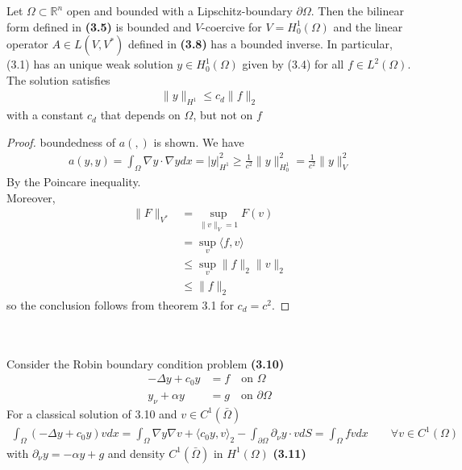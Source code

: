 \begin{theorem}
	Let $\Omega \subset \mathbb{R}^n$ open and bounded with a Lipschitz-boundary $\partial \Omega$. Then the bilinear form defined in \textbf{(3.5)} is bounded and $V$-coercive for $V = H_0^1(\Omega)$ and the linear operator $A \in L(V, V^*)$ defined in \textbf{(3.8)} has a bounded inverse. In particular, (3.1) has an unique weak solution $y \in H_0^1(\Omega)$ given by (3.4) for all $f \in L^2(\Omega)$. The solution satisfies
	\begin{align*}
		\|y\|_{H^1} \le c_d \|f\|_2
	\end{align*}
	with a constant $c_d$ that depends on $\Omega$, but not on $f$
\end{theorem}
\begin{proof}
	boundedness of $a(,)$ is shown. We have
	\begin{align*}
		a(y, y) = \int_\Omega \nabla y \cdot \nabla y dx = |y|^2_{H^1} 
		\geq \frac{1}{c^2} \|y\|_{H_0^1}^2 = \frac{1}{c^2}\|y\|^2_V
	\end{align*}
	By the Poincare inequality. \\
	Moreover, 
	\begin{align*}
		\|F\|_{V^*} &= \sup_{\|v\|_V = 1} F(v) \\
		&= \sup_v \langle f, v \rangle \\
		&\le \sup_v \|f\|_2 \|v\|_2 \\
		&\le \|f\|_2
	\end{align*}
	so the conclusion follows from theorem 3.1 for $c_d = c^2$. 
\end{proof}
\quad\\
\quad\\
Consider the Robin boundary condition problem \textbf{(3.10)}
\begin{align*}
	-\Delta y + c_0 y &= f \quad \text{on } \Omega \\
	y_\nu + \alpha y &= g \quad \text{on } \partial \Omega
\end{align*}
For a classical solution of 3.10 and $v \in C^1(\bar{\Omega})$ 
\begin{align*}
	\int_\Omega (-\Delta y + c_0 y )v dx = \int_\Omega \nabla y \nabla v + 
	\langle c_0 y , v \rangle_2 - \int_{\partial \Omega} \partial_\nu y \cdot  v  dS = \int_\Omega fv dx \qquad \forall v \in C^1(\Omega)
\end{align*}
with $\partial_\nu y = - \alpha y + g$ and density $C^1(\bar{\Omega})$ in $H^1(\Omega)$  \textbf{(3.11)}
